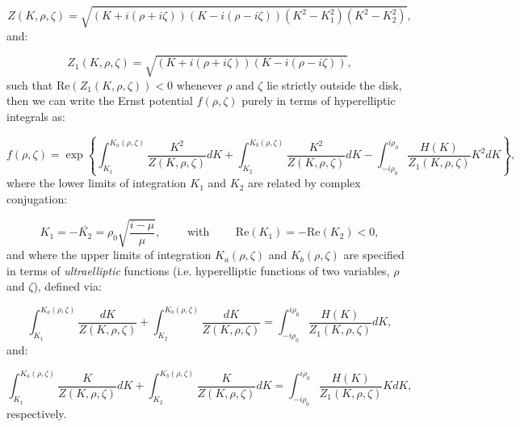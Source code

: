 \documentclass{article}
\begin{document}
\begin{equation}
Z \left( K, \rho, \zeta \right) = \sqrt{\left( K + i \left( \rho + i \zeta \right) \right) \left( K - i \left( \rho - i \zeta \right) \right) \left( K^2 - K_{1}^{2} \right) \left( K^2 - K_{2}^{2} \right)},
\end{equation}
and:

\begin{equation}
Z_1 \left( K, \rho, \zeta \right) = \sqrt{\left( K + i \left( \rho + i \zeta \right) \right) \left( K - i \left( \rho - i \zeta \right) \right)},
\end{equation}
such that ${\mathrm{Re} \left( Z_1 \left( K, \rho, \zeta \right) \right) < 0}$ whenever ${\rho}$ and ${\zeta}$ lie strictly outside the disk, then we can write the Ernst potential ${f \left( \rho, \zeta \right)}$ purely in terms of hyperelliptic integrals as:

\begin{equation}
f \left( \rho, \zeta \right) = \exp \left\lbrace \int_{K_1}^{K_a \left( \rho, \zeta \right)} \frac{K^2}{Z \left( K, \rho, \zeta \right)} dK + \int_{K_2}^{K_b \left( \rho, \zeta \right)} \frac{K^2}{Z \left( K, \rho, \zeta \right)} dK - \int_{-i \rho_0}^{i \rho_0} \frac{H \left( K \right)}{Z_1 \left( K, \rho, \zeta \right)} K^2 dK \right\rbrace,
\end{equation}
where the lower limits of integration ${K_1}$ and ${K_2}$ are related by complex conjugation:

\begin{equation}
K_1 = - \bar{K_2} = \rho_0 \sqrt{\frac{i - \mu}{\mu}}, \qquad \text{ with } \qquad \mathrm{Re} \left( K_1 \right) = - \mathrm{Re} \left( K_2 \right) < 0,
\end{equation}
and where the upper limits of integration ${K_a \left( \rho, \zeta \right)}$ and ${K_b \left( \rho, \zeta \right)}$ are specified in terms of \textit{ultraelliptic} functions (i.e. hyperelliptic functions of two variables, ${\rho}$ and ${\zeta}$), defined via:

\begin{equation}
\int_{K_1}^{K_a \left( \rho, \zeta \right)} \frac{dK}{Z \left( K, \rho, \zeta \right)} + \int_{K_2}^{K_b \left( \rho, \zeta \right)} \frac{dK}{Z \left( K, \rho, \zeta \right)} = \int_{-i \rho_0}^{i \rho_0} \frac{H \left( K \right)}{Z_1 \left( K, \rho, \zeta \right)} dK,
\end{equation}
and:

\begin{equation}
\int_{K_1}^{K_a \left( \rho, \zeta \right)} \frac{K}{Z \left( K, \rho, \zeta \right)} dK + \int_{K_2}^{K_b \left( \rho, \zeta \right)} \frac{K}{Z \left( K, \rho, \zeta \right)} dK = \int_{-i \rho_0}^{i \rho_0} \frac{H \left( K \right)}{Z_1 \left( K, \rho, \zeta \right)} K dK,
\end{equation}
respectively.
\end{document}
